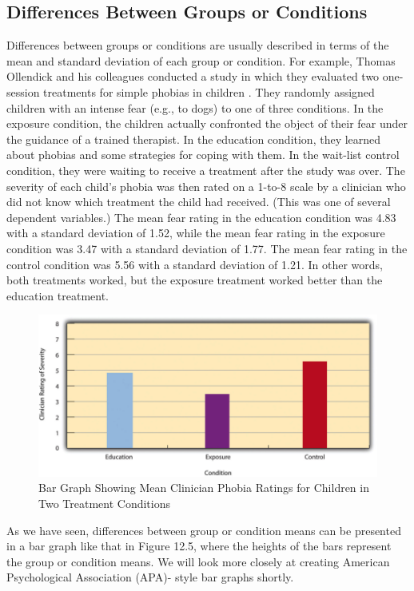 \subsection{Differences Between Groups or Conditions}

Differences between groups or conditions are usually described in terms of the mean and standard deviation of each group or condition. For example, Thomas Ollendick and his colleagues conducted a study in which they evaluated two one-session treatments for simple phobias in children \citep{ollendick_one-session_2009}. They randomly assigned children with an intense fear (e.g., to dogs) to one of three conditions. In the exposure condition, the children actually confronted the object of their fear under the guidance of a trained therapist. In the education condition, they learned about phobias and some strategies for coping with them. In the wait-list control condition, they were waiting to receive a treatment after the study was over. The severity of each child's phobia was then rated on a 1-to-8 scale by a clinician who did not know which treatment the child had received. (This was one of several dependent variables.) The mean fear rating in the education condition was 4.83 with a standard deviation of 1.52, while the mean fear rating in the exposure condition was 3.47 with a standard deviation of 1.77. The mean fear rating in the control condition was 5.56 with a standard deviation of 1.21. In other words, both treatments worked, but the exposure treatment worked better than the education treatment.

\begin{figure}

\includegraphics[width=.7\linewidth]{figures/Fig12-5}

\caption{Bar Graph Showing Mean Clinician Phobia Ratings for Children in Two Treatment Conditions}

\label{fig:bar}

\end{figure}

As we have seen, differences between group or condition means can be presented in a bar graph like that in Figure 12.5, where the heights of the bars represent the group or condition means. We will look more closely at creating American Psychological Association (APA)- style bar graphs shortly.

